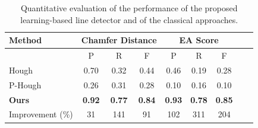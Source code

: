 \begin{table}[t!]
	\centering
	\begin{tabular}{lcccccccl}
		\toprule
		\textbf{Method}&\multicolumn{3}{c}{\textbf{Chamfer Distance}} & \multicolumn{3}{c}{\textbf{EA Score}}\\
		\midrule
		&P&R&F&P&R&F\\
		Hough&0.70&0.32&0.44&0.46&0.19&0.28\\
		P-Hough&0.26&0.31&0.28&0.10&0.16&0.10\\
		\midrule
		\textbf{Ours}&\textbf{0.92}&\textbf{0.77}&\textbf{0.84}&\textbf{0.93}&\textbf{0.78}&\textbf{0.85}\\
        \midrule
		Improvement (\%)&31&141&91&102&311&204\\
		\bottomrule
	\end{tabular}
    \vspace{1ex}
	\caption{Quantitative evaluation of the performance of the proposed learning-based line detector and of the classical approaches.}

	\label{tab:quant_eval_in}
      \vspace{-2.5ex}

\end{table}
%
